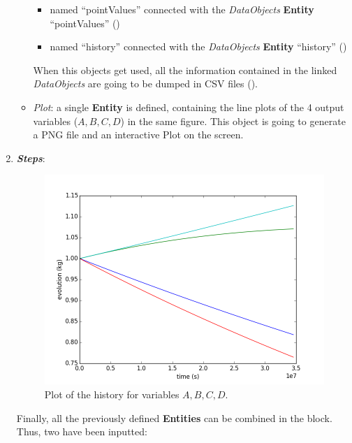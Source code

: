 \begin{enumerate}
\begin{itemize}
     \begin{itemize}
       \item named ``pointValues'' connected with the \textit{DataObjects} \textbf{Entity} ``pointValues''
                ()
       \item named ``history'' connected with the \textit{DataObjects} \textbf{Entity} ``history'' ()
     \end{itemize}
      When this objects get used, all the information contained in the linked  \textit{DataObjects} are going
    to be dumped in CSV files ().
    \item \textit{Plot}: a single  \textbf{Entity} is defined, containing the line plots of the 4 output variables
    ($A,B,C,D$) in the same figure. This object is going to generate a PNG file and an interactive Plot on
    the screen.
  \end{itemize}
   \item \textbf{\textit{Steps}}:
 \begin{figure}[h!]
  \centering
  \includegraphics[scale=0.7]{pics/1-historyPlot_line-line-line-line.png}
  \caption{Plot of the history for variables $A,B,C,D$.}
  \label{fig:historyPlotLine}
 \end{figure}
   Finally, all the previously defined \textbf{Entities} can be combined in the  block. Thus,
   two  have been inputted:

\end{enumerate}
